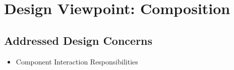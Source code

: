 \documentclass[onecolumn, draftclsnofoot,10pt, compsoc]{IEEEtran}
\newcommand{\designConcernRef}[2][]{
    #2 #1
}
\begin{document}
%
%
%
\section{Design Viewpoint: Composition}
    \subsection{Addressed Design Concerns}
        \begin{itemize}
            \item \designConcernRef[]{Component Interaction Responsibilities}
        \end{itemize}
\end{document}
